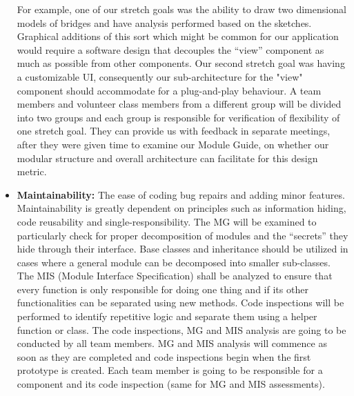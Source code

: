 \documentclass[12pt, titlepage]{article}
\begin{document}
\begin{itemize}
For example, one of our stretch goals was the ability to draw two dimensional models of bridges and have analysis performed based on the sketches. Graphical additions of this sort which might be common for our application would require a software design that decouples the “view” component as much as possible from other components. Our second stretch goal was having a customizable UI, consequently our sub-architecture for the "view" component should accommodate for a plug-and-play behaviour. A team members and volunteer class members from a different group will be divided into two groups and each group is responsible for verification of flexibility of one stretch goal. They can provide us with feedback in separate meetings, after they were given time to examine our Module Guide, on whether our modular structure and overall architecture can facilitate for this design metric.\\
\item\textbf{Maintainability:} The ease of coding bug repairs and adding minor features.\\
Maintainability is greatly dependent on principles such as information hiding, code reusability and single-responsibility. The MG will be examined to particularly check for proper decomposition of modules and the “secrets” they hide through their interface. Base classes and inheritance should be utilized in cases where a general module can be decomposed into smaller sub-classes. The MIS (Module Interface Specification) shall be analyzed to ensure that every function is only responsible for doing one thing and if its other functionalities can be separated using new methods. Code inspections will be performed to identify repetitive logic and separate them using a helper function or class. The code inspections, MG and MIS analysis are going to be conducted by all team members. MG and MIS analysis will commence as soon as they are completed and code inspections begin when the first prototype is created. Each team member is going to be responsible for a component and its code inspection (same for MG and MIS assessments).
\end{itemize}
\end{document}

